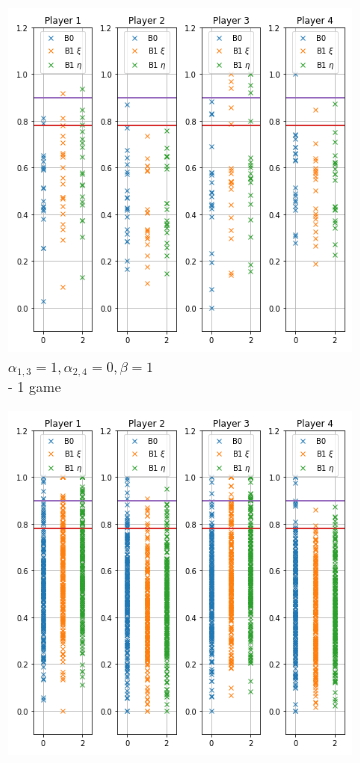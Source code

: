 \begin{figure}[!hb]
	\centering
	\begin{subfigure}{0.3\textwidth}
	    \centering
	    \includegraphics[width=1\linewidth]{Bilder/exp1.png}
	    \caption{$\alpha_{1,3}=1,\alpha_{2,4}=0,\beta=1$ \\- 1 game}
	    \label{fig:30}
    \end{subfigure}%
	\begin{subfigure}{0.3\textwidth}
	    \centering
	    \includegraphics[width=1\linewidth]{Bilder/exp2.png}

\end{subfigure}
\end{figure}
